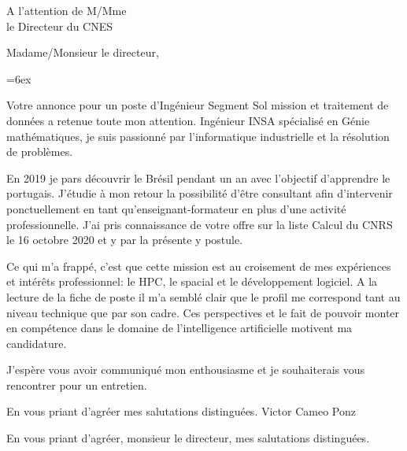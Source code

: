 \documentclass[10pt,a4paper]{lettre}
\begin{document}
\begin{letter}{A l'attention de M/Mme \\le Directeur du CNES}
\address{Victor Cameo Ponz\\16 rue Peyras\\31000 Toulouse}
\nofax

\opening{Madame/Monsieur le directeur,}

\parindent=6ex

Votre annonce pour un poste d'Ingénieur Segment Sol mission et traitement de
données a retenue toute mon attention. Ingénieur INSA spécialisé en Génie
mathématiques, je suis passionné par l'informatique industrielle et la résolution
de problèmes.

En 2019 je pars découvrir le Brésil pendant un an avec l'objectif d'apprendre le
 portugais. J'étudie à mon retour la possibilité d'être consultant afin
 d'intervenir ponctuellement en tant qu'enseignant-formateur en plus d'une activité
 professionnelle. J'ai pris connaissance de votre offre sur la liste Calcul du CNRS
  le 16 octobre 2020 et y par la présente y postule.

Ce qui m'a frappé, c'est que cette mission est au croisement de mes expériences
 et intérêts professionnel: le HPC, le spacial et le développement logiciel.
 A la lecture de la fiche de poste il m'a semblé clair que le profil me correspond
 tant au niveau technique que par son cadre. Ces perspectives et le fait de pouvoir
  monter en compétence dans le domaine de l'intelligence artificielle motivent ma candidature.

J'espère vous avoir communiqué mon enthousiasme et je souhaiterais vous rencontrer pour un entretien.

En vous priant d'agréer mes salutations distinguées.
Victor Cameo Ponz

\closing{En vous priant d'agréer, monsieur le directeur, mes salutations distinguées.}
\end{letter}
\end{document}
